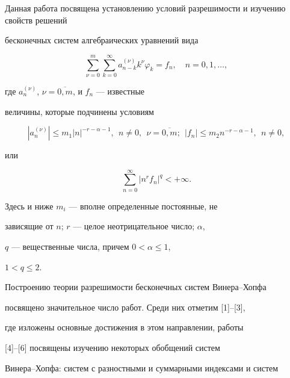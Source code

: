 Данная работа посвящена установлению условий разрешимости и изучению свойств решений


бесконечных систем алгебраических уравнений вида


\begin{equation}


\label{l1}


\sum_{\nu=0}^m\sum_{k=0}^\infty


a_{n-k}^{(\nu)}k^\nu\varphi_k=f_n, \quad n=0,1,\dotsc,


\end{equation}


где $a_n^{(\nu)}$, $\nu=\overline{0,m}$, и $f_n$ --- известные


величины, которые подчинены условиям


\begin{equation}


\label{l2}


|a_n^{(\nu)}| \leqslant m_1|n|^{-r-\alpha-1},\ \ n \neq


0,\ \ \nu=\overline{0,m};\ \ |f_n|\leqslant m_2 n^{-r-\alpha-1},


\ \ n \neq 0,


\end{equation}


или


\begin{equation}


\label{l3}


\sum_{n=0}^\infty |n^r f_n|^q<+\infty.


\end{equation}


Здесь и ниже $m_i$ --- вполне определенные постоянные, не


зависящие от $n$; $r$ --- целое неотрицательное число; $\alpha$,


$q$ --- вещественные числа, причем $0<\alpha\leqslant 1$,


$1<q\leqslant 2$.





Построению теории разрешимости бесконечных систем Винера--Хопфа


посвящено значительное число работ. Среди них отметим [1]--[3],


где изложены основные достижения в этом направлении, работы


[4]--[6] посвящены изучению некоторых обобщений систем


Винера--Хопфа: систем с разностными и суммарными индексами и систем


